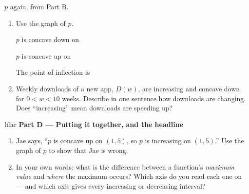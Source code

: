 \documentclass[10pt]{article}
\begin{document}
\begin{enumerate}[leftmargin=1.9em, itemsep=9pt, start=5]
\begin{minipage}[t]{0.34\linewidth}
      {\footnotesize $p$ again, from Part B.}
      \end{minipage}\hfill
      \begin{minipage}[t]{0.62\linewidth}
      \vspace{0pt}
      \begin{enumerate}[label=\arabic*., leftmargin=1.9em, itemsep=8pt, start=6]
      \item Use the graph of $p$.

            $p$ is concave down on \hfill {}

            $p$ is concave up on \hfill {}

            The point of inflection is \hfill {}

      \item Weekly downloads of a new app, $D(w)$, are increasing and concave down for
            $0 < w < 10$ weeks. Describe in one sentence how downloads are changing. Does
            ``increasing'' mean downloads are speeding up?
      \end{enumerate}
      \end{minipage}

\end{enumerate}

\vspace{0.06in}

\begin{headlinebox}{lilac}
\textbf{\color{plum}Part D --- Putting it together, and the headline}
\end{headlinebox}

\begin{enumerate}[leftmargin=1.9em, itemsep=9pt, start=8]

\item Jae says, ``$p$ is concave up on $(1, 5)$, so $p$ is increasing on $(1, 5)$.'' Use the
      graph of $p$ to show that Jae is wrong.

\item In your own words: what is the difference between a function's \emph{maximum value} and
      \emph{where} the maximum occurs? Which axis do you read each one on --- and which axis
      gives every increasing or decreasing interval?

\end{enumerate}
\end{document}
